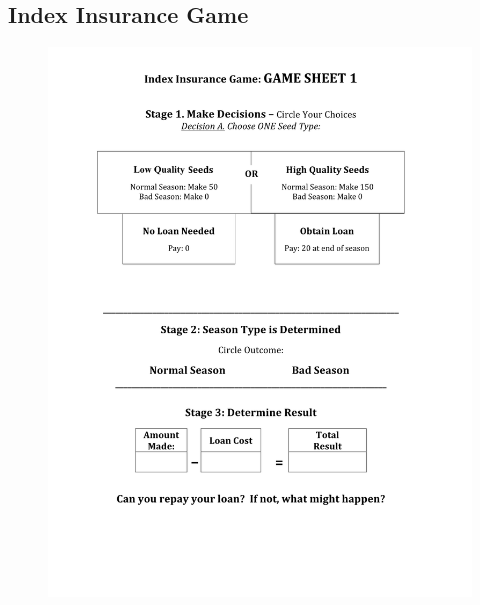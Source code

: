 \documentclass[letterpaper,10pt,english]{sphinxmanual}
\begin{document}
\subsection{Index Insurance Game}
\label{whatisindexinsurance/Climate_risk_and_opportunities_updated_intro:index-insurance-game}\begin{figure}[htbp]
\centering

\includegraphics{indexinsurancegame1_en1.png}
\end{figure}
\end{document}
